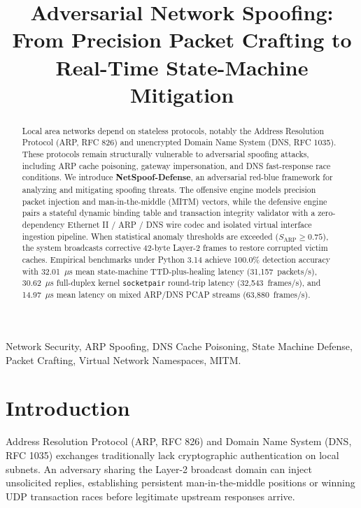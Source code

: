 \documentclass[conference]{IEEEtran}
\begin{document}
\title{Adversarial Network Spoofing: From Precision Packet Crafting to Real-Time State-Machine Mitigation}

\author{
}

\maketitle

\begin{abstract}
Local area networks depend on stateless protocols, notably the Address Resolution Protocol (ARP, RFC 826) and unencrypted Domain Name System (DNS, RFC 1035). These protocols remain structurally vulnerable to adversarial spoofing attacks, including ARP cache poisoning, gateway impersonation, and DNS fast-response race conditions. We introduce \textbf{NetSpoof-Defense}, an adversarial red-blue framework for analyzing and mitigating spoofing threats. The offensive engine models precision packet injection and man-in-the-middle (MITM) vectors, while the defensive engine pairs a stateful dynamic binding table and transaction integrity validator with a zero-dependency Ethernet II / ARP / DNS wire codec and isolated virtual interface ingestion pipeline. When statistical anomaly thresholds are exceeded ($S_{\text{ARP}} \ge 0.75$), the system broadcasts corrective 42-byte Layer-2 frames to restore corrupted victim caches. Empirical benchmarks under Python 3.14 achieve 100.0\% detection accuracy with 32.01~$\mu$s mean state-machine TTD-plus-healing latency (31,157~packets/s), 30.62~$\mu$s full-duplex kernel \texttt{socketpair} round-trip latency (32,543~frames/s), and 14.97~$\mu$s mean latency on mixed ARP/DNS PCAP streams (63,880~frames/s).
\end{abstract}

\begin{IEEEkeywords}
Network Security, ARP Spoofing, DNS Cache Poisoning, State Machine Defense, Packet Crafting, Virtual Network Namespaces, MITM.
\end{IEEEkeywords}

\section{Introduction}
Address Resolution Protocol (ARP, RFC 826) and Domain Name System (DNS, RFC 1035) exchanges traditionally lack cryptographic authentication on local subnets. An adversary sharing the Layer-2 broadcast domain can inject unsolicited replies, establishing persistent man-in-the-middle positions or winning UDP transaction races before legitimate upstream responses arrive.
\end{document}
